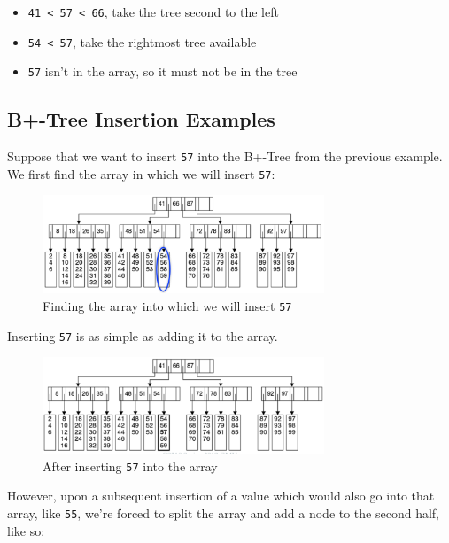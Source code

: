 \documentclass[
  10pt,
  english,
  letterpaper,
,tablecaptionabove
]{scrartcl}
\newcommand{\passthrough}[1]{#1}
\providecommand{\tightlist}{%
  \setlength{\itemsep}{0pt}\setlength{\parskip}{0pt}}
\begin{document}
\begin{itemize}
\tightlist
\item
  \passthrough{\lstinline!41 < 57 < 66!}, take the tree second to the
  left
\item
  \passthrough{\lstinline!54 < 57!}, take the rightmost tree available
\item
  \passthrough{\lstinline!57!} isn't in the array, so it must not be in
  the tree
\end{itemize}

\hypertarget{b-tree-insertion-examples}{%
\subsection{B+-Tree Insertion
Examples}\label{b-tree-insertion-examples}}

Suppose that we want to insert \passthrough{\lstinline!57!} into the
B+-Tree from the previous example. We first find the array in which we
will insert \passthrough{\lstinline!57!}:

\begin{figure}
\centering
\includegraphics[width=0.75\textwidth,height=\textheight]{images/7.png}
\caption{Finding the array into which we will insert
\passthrough{\lstinline!57!}}
\end{figure}

Inserting \passthrough{\lstinline!57!} is as simple as adding it to the
array.

\begin{figure}
\centering
\includegraphics[width=0.75\textwidth,height=\textheight]{images/8.png}
\caption{After inserting \passthrough{\lstinline!57!} into the array}
\end{figure}

However, upon a subsequent insertion of a value which would also go into
that array, like \passthrough{\lstinline!55!}, we're forced to split the
array and add a node to the second half, like so:
\end{document}
